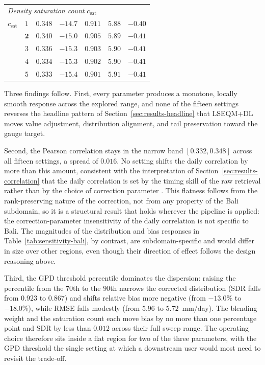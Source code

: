 \begin{table}[H]
\begin{tabular*}{\textwidth}{@{\extracolsep{\fill}}lcccccc@{}}
\midrule
\multicolumn{7}{l}{\textit{Density saturation count} $c_{\text{sat}}$} \\
$c_{\text{sat}}$ & $1$ & $0.348$ & $-14.7$ & $0.911$ & $5.88$ & $-0.40$ \\
                 & $\mathbf{2}$ & $\mathbf{0.340}$ & $\mathbf{-15.0}$ & $\mathbf{0.905}$ & $\mathbf{5.89}$ & $\mathbf{-0.41}$ \\
                 & $3$ & $0.336$ & $-15.3$ & $0.903$ & $5.90$ & $-0.41$ \\
                 & $4$ & $0.334$ & $-15.3$ & $0.902$ & $5.90$ & $-0.41$ \\
                 & $5$ & $0.333$ & $-15.4$ & $0.901$ & $5.91$ & $-0.41$ \\
\bottomrule
\end{tabular*}
\endgroup
\end{table}

Three findings follow. First, every parameter produces a
monotone, locally smooth response across the explored range, and
none of the fifteen settings reverses the headline pattern of
Section~\ref{sec:results-headline} that LSEQM+DL moves value
adjustment, distribution alignment, and tail preservation toward
the gauge target.

Second, the Pearson correlation stays in the
narrow band $[0.332, 0.348]$ across all fifteen settings, a
spread of $0.016$. No setting shifts the daily correlation by
more than this amount, consistent with the interpretation of
Section~\ref{sec:results-correlation} that the daily correlation
is set by the timing skill of the raw retrieval rather than
by the choice of correction parameter \citep{ref:maraun2013}. This
flatness follows from the rank-preserving nature of the correction,
not from any property of the Bali subdomain, so it is a structural
result that holds wherever the pipeline is applied: the
correction-parameter insensitivity of the daily correlation is not
specific to Bali. The magnitudes of the distribution and bias
responses in Table~\ref{tab:sensitivity-bali}, by contrast, are
subdomain-specific and would differ in size over other regions, even
though their direction of effect follows the design reasoning above.

Third, the GPD threshold percentile dominates the dispersion:
raising the percentile from the $70$th to the $90$th narrows
the corrected distribution (SDR falls from $0.923$ to $0.867$)
and shifts relative bias more negative (from $-13.0\%$ to
$-18.0\%$), while RMSE falls modestly (from $5.96$ to
$5.72$~mm/day). The blending weight and the saturation count
each move bias by no more than one percentage point and SDR by
less than $0.012$ across their full sweep range. The operating choice
therefore sits inside a flat region for two of the three
parameters, with the GPD threshold the single setting at which a
downstream user would most need to revisit the trade-off.


